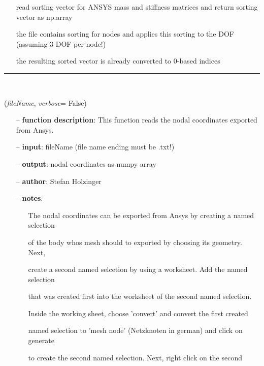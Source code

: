 \begin{itemize}[leftmargin=1.4cm]
\begin{itemize}[leftmargin=1.4cm]
\begin{itemize}[leftmargin=0.5cm]
\begin{itemize}[leftmargin=1.4cm]
\begin{itemize}[leftmargin=1.4cm]
\begin{itemize}[leftmargin=0.5cm]
\begin{itemize}[leftmargin=0.7cm]
\begin{itemize}[leftmargin=1.2cm]
\setlength{\itemindent}{-0.7cm}
\item[]read sorting vector for ANSYS mass and stiffness matrices and return sorting vector as np.array
\item[]the file contains sorting for nodes and applies this sorting to the DOF (assuming 3 DOF per node!)
\item[]the resulting sorted vector is already converted to 0-based indices
\end{itemize}
\vspace{12pt}\end{itemize}
%
\noindent\rule{8cm}{0.75pt}\vspace{1pt} \\ 
\begin{flushleft}
\label{sec:FEM:ReadNodalCoordinatesFromAnsysTxt}
({\it fileName}, {\it verbose}= False)
\end{flushleft}
\setlength{\itemindent}{0.7cm}
\begin{itemize}[leftmargin=0.7cm]
\item[--]{\bf function description}: This function reads the nodal coordinates exported from Ansys.
\item[--]{\bf input}: fileName (file name ending must be .txt!)
\item[--]{\bf output}: nodal coordinates as numpy array
\item[--]{\bf author}: Stefan Holzinger
\item[--]{\bf notes}: \vspace{-6pt}
\begin{itemize}[leftmargin=1.2cm]
\setlength{\itemindent}{-0.7cm}
\item[]The nodal coordinates can be exported from Ansys by creating a named selection
\item[]of the body whos mesh should to exported by choosing its geometry. Next,
\item[]create a second named selcetion by using a worksheet. Add the named selection
\item[]that was created first into the worksheet of the second named selection.
\item[]Inside the working sheet, choose 'convert' and convert the first created
\item[]named selection to 'mesh node' (Netzknoten in german) and click on generate
\item[]to create the second named selection. Next, right click on the second

\end{itemize}
\end{itemize}
\end{itemize}
\end{itemize}
\end{itemize}
\end{itemize}
\end{itemize}
\end{itemize}
